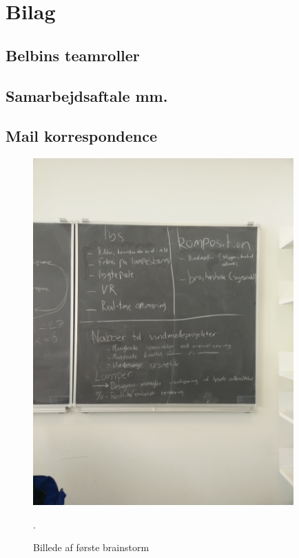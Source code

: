 \documentclass[oneside,a4paper,titlepage]{article}
\begin{document}
\section{Bilag}

\subsection{Belbins teamroller}

\subsection{Samarbejdsaftale mm.}

\subsection{Mail korrespondence}


\begin{figure}[H]
   \centering
   \includegraphics[width=10cm]{../graphics/brainstorm_1}
   \caption{Billede af første brainstorm}.
\end{figure}
\end{document}
